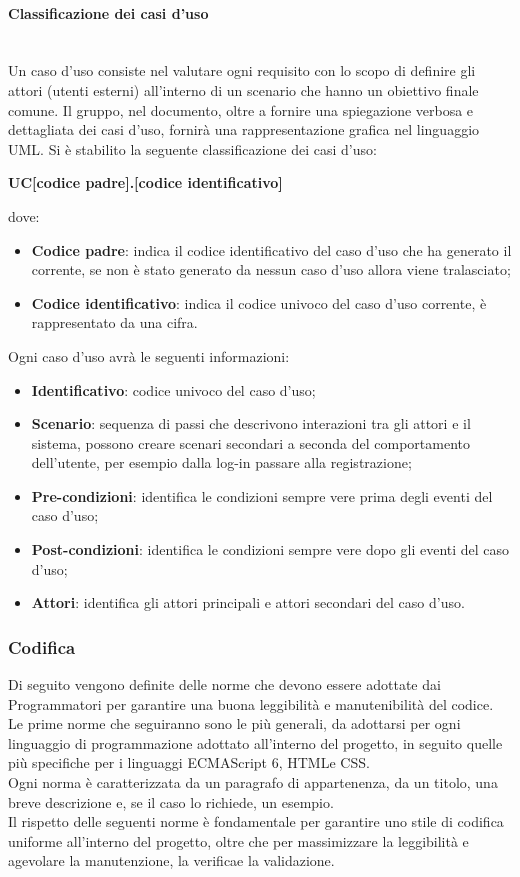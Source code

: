 \paragraph{Classificazione dei casi d'uso} \-\\
Un caso d'uso consiste nel valutare ogni requisito con lo scopo di definire gli attori (utenti esterni) all'interno di un scenario che hanno un obiettivo finale comune. Il gruppo, nel documento, oltre a fornire una spiegazione verbosa e dettagliata dei casi d'uso, fornirà una rappresentazione grafica nel linguaggio UML.
Si è stabilito la seguente classificazione dei casi d'uso:
\begin{center}
	\textbf{UC[codice padre].[codice identificativo]}
\end{center}
dove:
\begin{itemize}
	\item \textbf{Codice padre}: indica il codice identificativo del caso d'uso che ha generato il corrente, se non è stato generato da nessun caso d'uso allora viene tralasciato;
	\item \textbf{Codice identificativo}: indica il codice univoco del caso d'uso corrente, è rappresentato da una cifra.
\end{itemize}
Ogni caso d'uso avrà le seguenti informazioni:
\begin{itemize}
	\item \textbf{Identificativo}: codice univoco del caso d'uso;
	\item \textbf{Scenario}: sequenza di passi che descrivono interazioni tra gli attori e il sistema, possono creare scenari secondari a seconda del comportamento dell'utente, per esempio dalla log-in passare alla registrazione;
	\item \textbf{Pre-condizioni}: identifica le condizioni sempre vere prima degli eventi del caso d'uso;
	\item \textbf{Post-condizioni}: identifica le condizioni sempre vere dopo gli eventi del caso d'uso;
	\item \textbf{Attori}: identifica gli attori principali e attori secondari del caso d'uso. 
\end{itemize}

\subsubsection{Codifica}
Di seguito vengono definite delle norme che devono essere adottate dai Programmatori per garantire una buona leggibilità  e manutenibilità  del codice. Le prime norme che seguiranno sono le più generali, da adottarsi per ogni linguaggio di programmazione adottato all'interno del progetto, in seguito quelle più specifiche per i linguaggi ECMAScript 6\glossario, HTML\glossario e CSS\glossario.\\
Ogni norma è caratterizzata da un paragrafo di appartenenza, da un titolo, una breve descrizione e, se il caso lo richiede, un esempio.\\
Il rispetto delle seguenti norme è fondamentale per garantire uno stile di codifica uniforme all'interno del progetto, oltre che per massimizzare la leggibilità  e agevolare la manutenzione, la verifica\glossario e la validazione\glossario.

